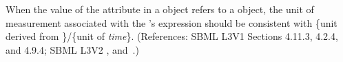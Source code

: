 When the value of the attribute  in a \RateRule object
refers to a \SpeciesReference object, the unit of measurement associated
with the \RateRule's  expression should be consistent with
\{unit derived from \}/\{unit of \emph{time}\}.
(References: SBML L3V1 Sections 4.11.3, 4.2.4, and 4.9.4; SBML L3V2 ,
 and~.)
